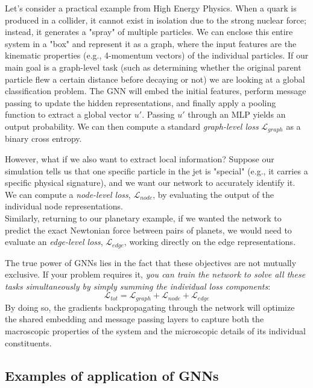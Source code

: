 Let's consider a practical example from High Energy Physics. When a quark is produced in a collider, it cannot exist in isolation due to the strong nuclear force; instead, it generates a "spray" of multiple particles. We can enclose this entire system in a "box" and represent it as a graph, where the input features are the kinematic properties (e.g., 4-momentum vectors) of the individual particles. If our main goal is a graph-level task (such as determining whether the original parent particle flew a certain distance before decaying or not) we are looking at a global classification problem. The GNN will embed the initial features, perform message passing to update the hidden representations, and finally apply a pooling function to extract a global vector $u'$. Passing $u'$ through an MLP yields an output probability. We can then compute a standard \textit{graph-level loss} $\mathcal{L}_{graph}$ as a binary cross entropy.

However, what if we also want to extract local information? Suppose our simulation tells us that one specific particle in the jet is "special" (e.g., it carries a specific physical signature), and we want our network to accurately identify it. We can compute a \textit{node-level loss}, $\mathcal{L}_{node}$, by evaluating the output of the individual node representations.\\
Similarly, returning to our planetary example, if we wanted the network to predict the exact Newtonian force between pairs of planets, we would need to evaluate an \textit{edge-level loss}, $\mathcal{L}_{edge}$, working directly on the edge representations.

The true power of GNNs lies in the fact that these objectives are not mutually exclusive. If your problem requires it, \textit{you can train the network to solve all these tasks simultaneously by simply summing the individual loss components}:
\begin{equation}
    \mathcal{L}_{tot} = \mathcal{L}_{graph} + \mathcal{L}_{node} + \mathcal{L}_{edge}
\end{equation}
By doing so, the gradients backpropagating through the network will optimize the shared embedding and message passing layers to capture both the macroscopic properties of the system and the microscopic details of its individual constituents.

\subsection{Examples of application of GNNs}

